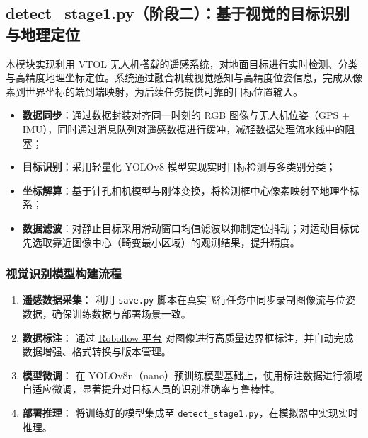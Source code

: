\documentclass[12pt]{article}
\begin{document}
\subsection{detect\_stage1.py（阶段二）：基于视觉的目标识别与地理定位}

本模块实现利用 VTOL 无人机搭载的遥感系统，对地面目标进行实时检测、分类与高精度地理坐标定位。系统通过融合机载视觉感知与高精度位姿信息，完成从像素到世界坐标的端到端映射，为后续任务提供可靠的目标位置输入。

\begin{itemize}
    \item \textbf{数据同步}：通过数据封装对齐同一时刻的 RGB 图像与无人机位姿（GPS + IMU），同时通过消息队列对遥感数据进行缓冲，减轻数据处理流水线中的阻塞；
    \item \textbf{目标识别}：采用轻量化 YOLOv8 模型实现实时目标检测与多类别分类；
    \item \textbf{坐标解算}：基于针孔相机模型与刚体变换，将检测框中心像素映射至地理坐标系；
    \item \textbf{数据滤波}：对静止目标采用滑动窗口均值滤波以抑制定位抖动；对运动目标优先选取靠近图像中心（畸变最小区域）的观测结果，提升精度。
\end{itemize}

\subsubsection{视觉识别模型构建流程}

\begin{enumerate}
    \item \textbf{遥感数据采集}：  
    利用 \texttt{save.py} 脚本在真实飞行任务中同步录制图像流与位姿数据，确保训练数据与部署场景一致。

    \item \textbf{数据标注}：  
    通过 \href{https://app.roboflow.com/join/eyJhbGciOiJIUzI1NiIsInR5cCI6IkpXVCJ9.eyJ3b3Jrc3BhY2VJZCI6IlQ4VGZpZ0FqQkdOMWIzT1pITjNNMUJ3dDNoazIiLCJyb2xlIjoib3duZXIiLCJpbnZpdGVyIjoiaGFpa2U4MjZAZ21haWwuY29tIiwiaWF0IjoxNzUzNjc5NTUzfQ.ksRN2pjtnuXkUIybOxv0PoRmLFUzQssGo_Zjj3tStE0}{Roboflow 平台} 对图像进行高质量边界框标注，并自动完成数据增强、格式转换与版本管理。

    \item \textbf{模型微调}：  
    在 YOLOv8n（nano）预训练模型基础上，使用标注数据进行领域自适应微调，显著提升对目标人员的识别准确率与鲁棒性。

    \item \textbf{部署推理}：  
    将训练好的模型集成至 \texttt{detect\_stage1.py}，在模拟器中实现实时推理。
\end{enumerate}
\end{document}
